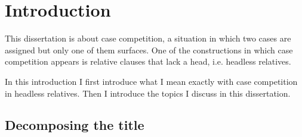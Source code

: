 
\chapter{Introduction}

This dissertation is about case competition, a situation in which two cases are assigned but only one of them surfaces. One of the constructions in which case competition appears is relative clauses that lack a head, i.e. headless relatives.

%

In this introduction I first introduce what I mean exactly with case competition in headless relatives. Then I introduce the topics I discuss in this dissertation.


\section{Decomposing the title}



